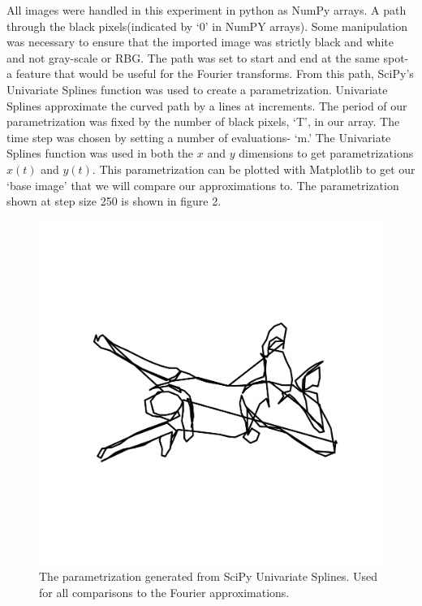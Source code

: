 \documentclass[psamsfonts]{amsart}
\theoremstyle{definition}
\theoremstyle{remark}
\numberwithin{equation}{section}
\begin{document}
 All images were handled in this experiment in python as NumPy arrays. A path through the black pixels(indicated by `0' in NumPY arrays). Some manipulation was necessary to ensure that the imported image was strictly black and white and not gray-scale or RBG. The path was set to start and end at the same spot- a feature that would be useful for the Fourier transforms. From this path, SciPy's Univariate Splines function was used to create a parametrization. Univariate Splines approximate the curved path by a lines at increments. The period of our parametrization was fixed by the number of black pixels, `T', in our array. The time step was chosen by setting a number of evaluations- `m.' The Univariate Splines function was used in both the $x$ and $y$ dimensions to get parametrizations $x(t)$ and $y(t)$. 
This parametrization can be plotted with Matplotlib to get our `base image' that we will compare our approximations to.  The parametrization shown at step size 250 is shown in figure 2. 

\begin{figure}[h!]
	\centering
	\includegraphics[scale=.2]{girl_250_param.png}
	\caption{The parametrization generated from SciPy Univariate Splines. Used for all comparisons to the Fourier approximations.}
\end{figure}
\end{document}

